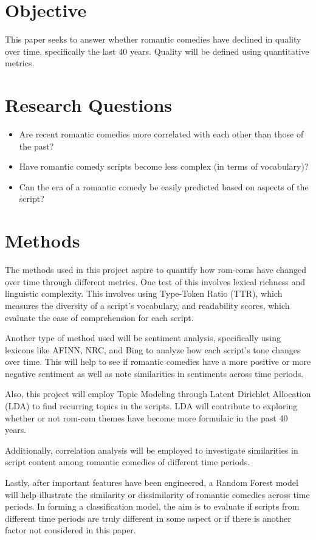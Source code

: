 \documentclass[
  authoryear,
  preprint]{elsarticle}
\providecommand{\tightlist}{%
  \setlength{\itemsep}{0pt}\setlength{\parskip}{0pt}}\usepackage{longtable,booktabs,array}
\begin{document}
\section{Objective}\label{objective}

This paper seeks to answer whether romantic comedies have declined in
quality over time, specifically the last 40 years. Quality will be
defined using quantitative metrics.

\section{Research Questions}\label{research-questions}

\begin{itemize}
\tightlist
\item
  Are recent romantic comedies more correlated with each other than
  those of the past?
\item
  Have romantic comedy scripts become less complex (in terms of
  vocabulary)?
\item
  Can the era of a romantic comedy be easily predicted based on aspects
  of the script?
\end{itemize}

\section{Methods}\label{methods}

The methods used in this project aspire to quantify how rom-coms have
changed over time through different metrics. One test of this involves
lexical richness and linguistic complexity. This involves using
Type-Token Ratio (TTR), which measures the diversity of a script's
vocabulary, and readability scores, which evaluate the ease of
comprehension for each script.

Another type of method used will be sentiment analysis, specifically
using lexicons like AFINN, NRC, and Bing to analyze how each script's
tone changes over time. This will help to see if romantic comedies have
a more positive or more negative sentiment as well as note similarities
in sentiments across time periods.

Also, this project will employ Topic Modeling through Latent Dirichlet
Allocation (LDA) to find recurring topics in the scripts. LDA will
contribute to exploring whether or not rom-com themes have become more
formulaic in the past 40 years.

Additionally, correlation analysis will be employed to investigate
similarities in script content among romantic comedies of different time
periods.

Lastly, after important features have been engineered, a Random Forest
model will help illustrate the similarity or dissimilarity of romantic
comedies across time periods. In forming a classification model, the aim
is to evaluate if scripts from different time periods are truly
different in some aspect or if there is another factor not considered in
this paper.


\renewcommand\refname{References}
  
\end{document}
